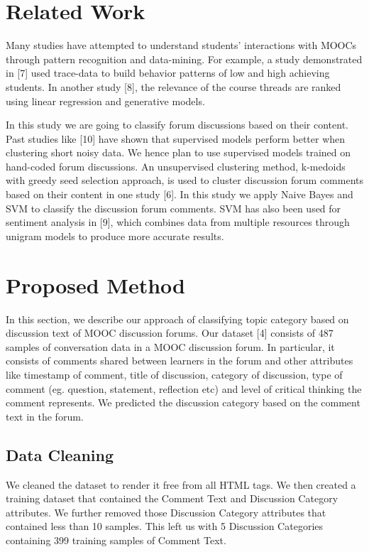\documentclass{article}
\begin{document}
\section{Related Work}
Many studies have attempted to understand students' interactions with MOOCs through pattern recognition and data-mining. For example, a study demonstrated in [7] used trace-data to build behavior patterns of low and high achieving students. In another study [8], the relevance of the course threads are ranked using linear regression and generative models.

In this study we are going to classify forum discussions based on their content. Past studies like [10] have shown that supervised models perform better when clustering short noisy data. We hence plan to use supervised models trained on hand-coded forum discussions. An unsupervised clustering method, k-medoids with greedy seed selection approach, is used to cluster discussion forum comments based on their content in one study [6]. In this study we apply Naive Bayes and SVM to classify the discussion forum comments. SVM has also been used for sentiment analysis in [9], which combines data from multiple resources through unigram models to produce more accurate results.

\section{Proposed Method}

In this section, we describe our approach of classifying topic category based on discussion text of MOOC discussion forums. Our dataset [4] consists of 487 samples of conversation data in a MOOC discussion forum. In particular, it consists of comments shared between learners in the forum and other attributes like timestamp of comment, title of discussion, category of discussion, type of comment (eg. question, statement, reflection etc) and level of critical thinking the comment represents. We predicted the discussion category based on the comment text in the forum.

\subsection{Data Cleaning}

We cleaned the dataset to render it free from all HTML tags. We then created a training dataset that contained the Comment Text and Discussion Category attributes. We further removed those  Discussion Category attributes that contained less than 10 samples. This left us with 5 Discussion Categories containing 399 training samples of Comment Text.
\end{document}
